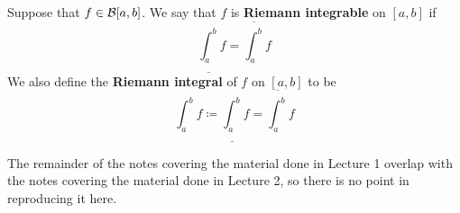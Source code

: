 \begin{defn}
  Suppose that $f \in \mathcal{B}[a, b]$. We say that $f$ is \textbf{Riemann integrable} on $[a, b]$ if
  \[
    \underline{\int_a^b} f = \overline{\int_a^b} f
  \]
  We also define the \textbf{Riemann integral} of $f$ on $[a, b]$ to be
  \[
    \int_a^b f \coloneqq \underline{\int_a^b} f = \overline{\int_a^b} f
  \]
\end{defn}

The remainder of the notes covering the material done in Lecture 1 overlap with the notes covering the material done in Lecture 2, so there is no point in reproducing it here.

